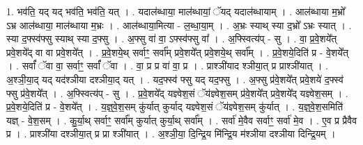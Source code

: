 \documentclass[17pt]{extarticle}
\begin{document}
1. भव॑ति॒ यद् यद् भव॑ति॒ भव॑ति॒ यत् । . यदाल॑ब्धाया॒ माल॑ब्धायां॒ ॅयद् यदाल॑ब्धायाम् । . आल॑ब्धाया म॒भ्रो᳚ ऽभ्र आल॑ब्धाया॒ माल॑ब्धाया म॒भ्रः । . आल॑ब्धाया॒मित्या - ल॒ब्धा॒या॒म् । . अ॒भ्रः स्याथ् स्या द॒भ्रो᳚ ऽभ्रः स्यात् । . स्या द॒फ्स्व॑फ्सु स्याथ् स्या द॒फ्सु । . अ॒फ्सु वा॑ वा॒ ऽफ्स्व॑फ्सु वा᳚ । . अ॒फ्स्वित्य॑प् - सु । . वा॒ प्र॒वे॒शये᳚त् प्रवे॒शये᳚द् वा वा प्रवे॒शये᳚त् । . प्र॒वे॒शये॒थ् सर्वाꣳ॒॒ सर्वा᳚म् प्रवे॒शये᳚त् प्रवे॒शये॒थ् सर्वा᳚म् । . प्र॒वे॒शये॒दिति॑ प्र - वे॒शये᳚त् । . सर्वां᳚ ॅवा वा॒ सर्वाꣳ॒॒ सर्वां᳚ ॅवा । . वा॒ प्र प्र वा॑ वा॒ प्र । . प्राश्ञी॑याद श्ञीया॒त् प्र प्राश्ञी॑यात् । . अ॒श्ञी॒या॒द् यद् यद॑श्ञीया दश्ञीया॒द् यत् । . यद॒फ्स्व॑ फ्सु यद् यद॒फ्सु । . अ॒फ्सु प्र॑वे॒शये᳚त् प्रवे॒शये॑ द॒फ्स्व॑ फ्सु प्र॑वे॒शये᳚त् । . अ॒फ्स्वित्य॑प् - सु । . प्र॒वे॒शये᳚द् यज्ञ्वेश॒सं ॅय॑ज्ञ्वेश॒सम् प्र॑वे॒शये᳚त् प्रवे॒शये᳚द् यज्ञ्वेश॒सम् । . प्र॒वे॒शये॒दिति॑ प्र - वे॒शये᳚त् । . य॒ज्ञ्॒वे॒श॒सम् कु॑र्यात् कुर्याद् यज्ञ्वेश॒सं ॅय॑ज्ञ्वेश॒सम् कु॑र्यात् । . य॒ज्ञ्॒वे॒श॒समिति॑ यज्ञ् - वे॒श॒सम् । . कु॒र्या॒थ् सर्वाꣳ॒॒ सर्वा᳚म् कुर्यात् कुर्या॒थ् सर्वा᳚म् । . सर्वा॑ मे॒वैव सर्वाꣳ॒॒ सर्वा॑ मे॒व । . ए॒व प्र प्रैवैव प्र । . प्राश्ञी॑या दश्ञीया॒त् प्र प्रा श्ञी॑यात् । . अ॒श्ञी॒या॒ दि॒न्द्रि॒य मि॑न्द्रि॒य म॑श्ञीया दश्ञीया दिन्द्रि॒यम् । \newline
\end{document}
